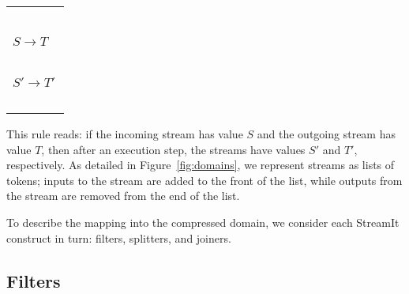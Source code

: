 \hspace{-12pt}\begin{tabular}{l} ~ \vspace{-6pt} \\ 
\hspace{-3pt}$S \rightarrow T$ \hspace{-7pt}~\vspace{0.5pt} \\ \hline ~ \vspace{-7.5pt} \\
\hspace{-3pt}$S' \rightarrow T'$ \hspace{-7pt} \\ ~ \vspace{-6pt} \\
\end{tabular}

This rule reads: if the incoming stream has value $S$ and the outgoing
stream has value $T$, then after an execution step, the streams have
values $S'$ and $T'$, respectively.  As detailed in
Figure~\ref{fig:domains}, we represent streams as lists of tokens;
inputs to the stream are added to the front of the list, while outputs
from the stream are removed from the end of the list.

To describe the mapping into the compressed domain, we consider each
StreamIt construct in turn: filters, splitters, and joiners.

\subsection{Filters}


